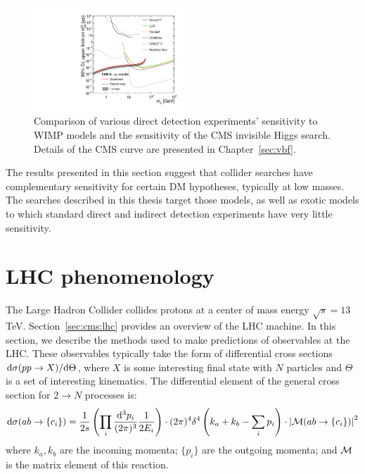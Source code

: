 \begin{figure}[]
    \begin{center}
        \includegraphics[width=0.5\textwidth]{figures/vbf/fits/dd.pdf}
        \caption{Comparison of various direct detection experiments' sensitivity to WIMP models and the sensitivity of the CMS invisible Higgs search.
                 Details of the CMS curve are presented in Chapter~\ref{sec:vbf}.}
        \label{fig:vbf:lux}
    \end{center}
\end{figure}

The results presented in this section suggest that collider searches have complementary sensitivity for certain DM hypotheses, typically at low masses.
The searches described in this thesis target those models, as well as exotic models to which standard direct and indirect detection experiments have very little sensitivity.

\section{LHC phenomenology}

The Large Hadron Collider collides protons at a center of mass energy $\sqrt{s} = 13$ TeV.
Section~\ref{sec:cms:lhc} provides an overview of the LHC machine.
In this section, we describe the methods used to make predictions of observables at the LHC.
These observables typically take the form of differential cross sections $\mathrm{d}\sigma(pp\rightarrow X)/\mathrm{d}\Theta$, where $X$ is some interesting final state with $N$ particles and $\Theta$ is a set of interesting kinematics.
The differential element of the general cross section for $2\rightarrow N$ processes is:
\begin{equation}
\mathrm{d}\sigma(ab\rightarrow \{c_i\}) = 
    \frac{1}{2s} \left(\prod_i \dfrac{\mathrm{d}^3p_i}{(2\pi)^3} \frac{1}{2E_i}\right) 
        \cdot (2\pi)^4 \delta^4\left(k_a + k_b - \sum_i p_i\right) 
        \cdot \left|\mathcal{M}(ab\rightarrow \{c_i\})\right|^2
        \label{eq:theory:2n}
\end{equation}
where $k_a,k_b$ are the incoming momenta; $\{p_i\}$ are the outgoing momenta; and $\mathcal{M}$ is the matrix element of this reaction.

